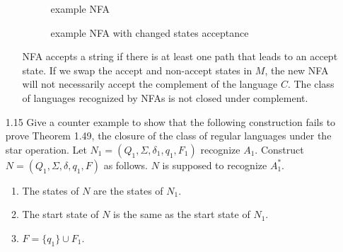 \begin{enumerate}
\begin{enumerate}
                    \begin{figure}[H]
                        \centering
                        \caption{example NFA}
                        \caption{example NFA with changed states acceptance}
                    \end{figure}
                    
                    NFA accepts a string if there is at least one path that leads to an accept state. If we swap the accept and non-accept states in $M$, the new NFA will not necessarily accept the complement of the language $C$. The class of languages recognized by NFAs is not closed under complement.
          \end{enumerate}
    \item [1.15]
          Give a counter example to show that the following construction fails to prove Theorem 1.49, the closure of the class of regular languages under the star operation. Let $N_1 = (Q_1,\Sigma,\delta_1,q_1,F_1)$ recognize $A_1$. Construct $N = (Q_1,\Sigma,\delta,q_1,F)$ as follows. $N$ is supposed to recognize $A_1^\ast$.
          \begin{enumerate}
              \item The states of $N$ are the states of $N_1$.
              \item The start state of $N$ is the same as the start state of $N_1$.
              \item $F =\{q_1\} \cup F_1$.
                    

\end{enumerate}
\end{enumerate}
